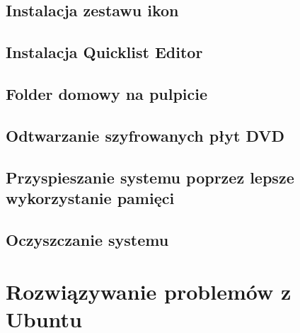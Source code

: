 \documentclass[a4paper,11pt,oneside]{mwart}
\begin{document}
		\subsection{Instalacja zestawu ikon}
			
		\subsection{Instalacja Quicklist Editor}
			
		\subsection{Folder domowy na pulpicie}
			
		\subsection{Odtwarzanie szyfrowanych płyt DVD}
			
		\subsection{Przyspieszanie systemu poprzez lepsze wykorzystanie pamięci}
			
		\subsection{Oczyszczanie systemu}
			
	\section{Rozwiązywanie problemów z Ubuntu}
\end{document}
